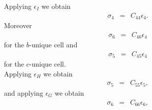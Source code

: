 \documentclass[12pt,a4paper]{article}
\begin{document}
Applying $\epsilon_I$ we obtain
\begin{eqnarray}
\sigma_4&=&C_{44} \epsilon_4.
\end{eqnarray}
Moreover
\begin{eqnarray}
\sigma_6&=&C_{46} \epsilon_4
\end{eqnarray}
for the $b$-unique cell and
\begin{eqnarray}
\sigma_5&=&C_{45} \epsilon_4
\end{eqnarray}
for the $c$-unique cell. \\
Applying $\epsilon_H$ we obtain
\begin{eqnarray}
\sigma_5&=&C_{55} \epsilon_5,
\end{eqnarray}
and applying $\epsilon_G$ we obtain
\begin{eqnarray}
\sigma_6&=&C_{66} \epsilon_6,
\end{eqnarray}
\end{document}
